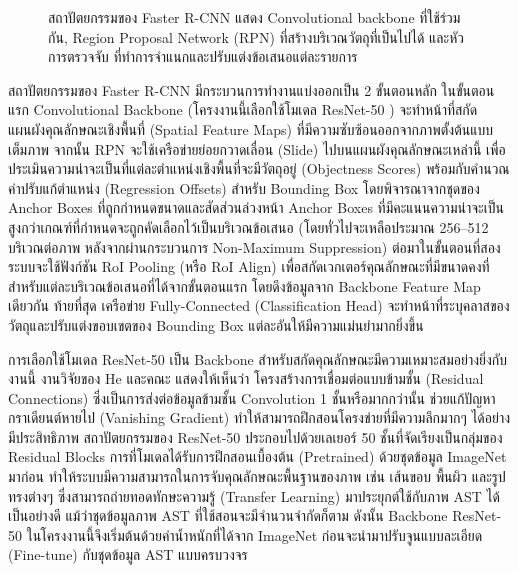 \begin{figure}[H]
  \centering
  \caption{สถาปัตยกรรมของ Faster R-CNN แสดง Convolutional backbone ที่ใช้ร่วมกัน,
    Region Proposal Network (RPN) ที่สร้างบริเวณวัตถุที่เป็นไปได้ และหัวการตรวจจับ
    ที่ทำการจำแนกและปรับแต่งข้อเสนอแต่ละรายการ \cite{ren2015faster}}
  \label{fig:faster_rcnn}
\end{figure}

สถาปัตยกรรมของ Faster R-CNN มีกระบวนการทำงานแบ่งออกเป็น 2 ขั้นตอนหลัก ในขั้นตอนแรก Convolutional Backbone (โครงงานนี้เลือกใช้โมเดล ResNet-50 \cite{he2016deep}) จะทำหน้าที่สกัดแผนผังคุณลักษณะเชิงพื้นที่ (Spatial Feature Maps) ที่มีความซับซ้อนออกจากภาพตั้งต้นแบบเต็มภาพ จากนั้น RPN จะใช้เครือข่ายย่อยกวาดเลื่อน (Slide) ไปบนแผนผังคุณลักษณะเหล่านี้ เพื่อประเมินความน่าจะเป็นที่แต่ละตำแหน่งเชิงพื้นที่จะมีวัตถุอยู่ (Objectness Scores) พร้อมกับคำนวณค่าปรับแก้ตำแหน่ง (Regression Offsets) สำหรับ Bounding Box โดยพิจารณาจากชุดของ Anchor Boxes ที่ถูกกำหนดขนาดและสัดส่วนล่วงหน้า Anchor Boxes ที่มีคะแนนความน่าจะเป็นสูงกว่าเกณฑ์ที่กำหนดจะถูกคัดเลือกไว้เป็นบริเวณข้อเสนอ (โดยทั่วไปจะเหลือประมาณ 256--512 บริเวณต่อภาพ หลังจากผ่านกระบวนการ Non-Maximum Suppression) ต่อมาในขั้นตอนที่สอง ระบบจะใช้ฟังก์ชัน RoI Pooling (หรือ RoI Align) เพื่อสกัดเวกเตอร์คุณลักษณะที่มีขนาดคงที่สำหรับแต่ละบริเวณข้อเสนอที่ได้จากขั้นตอนแรก โดยดึงข้อมูลจาก Backbone Feature Map เดียวกัน ท้ายที่สุด เครือข่าย Fully-Connected (Classification Head) จะทำหน้าที่ระบุคลาสของวัตถุและปรับแต่งขอบเขตของ Bounding Box แต่ละอันให้มีความแม่นยำมากยิ่งขึ้น

การเลือกใช้โมเดล ResNet-50 เป็น Backbone สำหรับสกัดคุณลักษณะมีความเหมาะสมอย่างยิ่งกับงานนี้ งานวิจัยของ He และคณะ แสดงให้เห็นว่า โครงสร้างการเชื่อมต่อแบบข้ามชั้น (Residual Connections) ซึ่งเป็นการส่งต่อข้อมูลข้ามชั้น Convolution 1 ชั้นหรือมากกว่านั้น ช่วยแก้ปัญหากราเดียนต์หายไป (Vanishing Gradient) ทำให้สามารถฝึกสอนโครงข่ายที่มีความลึกมากๆ ได้อย่างมีประสิทธิภาพ \cite{he2016deep} สถาปัตยกรรมของ ResNet-50 ประกอบไปด้วยเลเยอร์ 50 ชั้นที่จัดเรียงเป็นกลุ่มของ Residual Blocks การที่โมเดลได้รับการฝึกสอนเบื้องต้น (Pretrained) ด้วยชุดข้อมูล ImageNet มาก่อน ทำให้ระบบมีความสามารถในการจับคุณลักษณะพื้นฐานของภาพ เช่น เส้นขอบ พื้นผิว และรูปทรงต่างๆ ซึ่งสามารถถ่ายทอดทักษะความรู้ (Transfer Learning) มาประยุกต์ใช้กับภาพ AST ได้เป็นอย่างดี แม้ว่าชุดข้อมูลภาพ AST ที่ใช้สอนจะมีจำนวนจำกัดก็ตาม ดังนั้น Backbone ResNet-50 ในโครงงานนี้จึงเริ่มต้นด้วยค่าน้ำหนักที่ได้จาก ImageNet ก่อนจะนำมาปรับจูนแบบละเอียด (Fine-tune) กับชุดข้อมูล AST แบบครบวงจร

